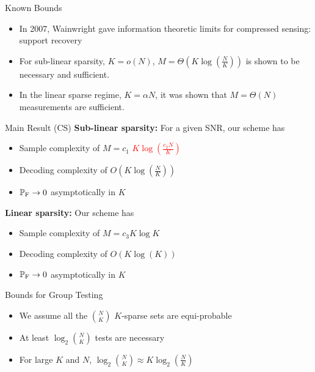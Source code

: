 \documentclass[final]{beamer}
\newlength{\onecolwid}
\newlength{\blockskip}
\newlength{\paraskip}
\begin{document}
\begin{frame}
\begin{columns}[t]
\begin{column}{\onecolwid}
 
    \begin{block}{\Large Known Bounds}
	\begin{itemize}
	\item In 2007, Wainwright gave information theoretic limits for compressed sensing: support recovery
	 \item For sub-linear sparsity, $K=o(N)$, $M=\Theta\left( K\log(\frac{N}{K	})\right)$
		is shown to be necessary and sufficient.
	  \item In the linear sparse regime, $K=\alpha N$, it was shown that $M=\Theta(N)$ measurements are sufficient. \cite{Wainwright}
	 \end{itemize}
	 
   \begin{alertblock}{\Large Main Result (CS)} 
	    \textbf{Sub-linear sparsity: }For a given SNR, our scheme has 
			\begin{itemize}
			\itemsep10pt
				\item Sample complexity of $M=c_1$ \textcolor{red}{$K\log (\frac{c_2 N}{K})$}
				\item Decoding complexity of $O\left(K\log(\frac{N}{K})\right)$ 
				\item $\mathbb{P}_{\text{F}}\rightarrow 0$ asymptotically in $K$
			\end{itemize} 
\vspace{\paraskip}    
  
   \textbf{Linear sparsity: }Our scheme has 
		\begin{itemize}
		\itemsep10pt
			\item Sample complexity of $M=c_3 K\log K$
			\item Decoding complexity of $O\left(K\log(K)\right)$ 
			\item $\mathbb{P}_{\text{F}}\rightarrow 0$ asymptotically in $K$
		\end{itemize} 
    \end{alertblock}
 \end{block}
  \vspace{\blockskip}   
    
    \begin{block}{\Large Bounds for Group Testing}
		\begin{itemize}
			 \item We assume all the $\binom{N}{K}$ $K$-sparse sets are equi-probable
			 \item At least $\log_2 \binom{N}{K}$ tests are necessary
			 \item For large $K$ and $N$, $\log_2 \binom{N}{K}\approx K\log_2(\frac{N}{K})$
	 \end{itemize}
	 

\end{block}
\end{column}
\end{columns}
\end{frame}
\end{document}
